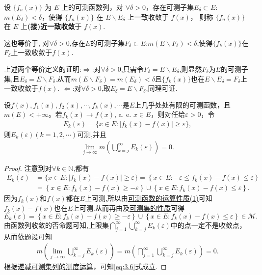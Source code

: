 \documentclass[../../main.tex]{subfiles}
\begin{document}
\begin{definition}[(接)近一致收敛]
设 $\{f_n(x)\}$ 为 $E$ 上的可测函数列，对 $\forall\delta > 0$，存在可测子集$E_\delta\subset E$:$m(E_\delta) < \delta$，使得 $\{f_n(x)\}$ 在 $E\backslash E_\delta$ 上一致收敛于 $f(x)$，
则称 $\{f_n(x)\}$ 在 $E$ 上\textbf{(接)近一致收敛}于 $f(x)$. 

这也等价于,
对$\forall \delta >0$,存在$E$的可测子集$F_\delta\subset E$:$m(E\backslash F_\delta)<\delta$,使得$\{f_k(x)\}$在$F_\delta$上一致收敛于$f(x)$.
\end{definition}
\begin{remark}
上述两个等价定义的证明:$\Rightarrow$:对$\forall \delta >0$,只需令$F_\delta=E\backslash E_\delta$,则显然$F_\delta$为$E$的可测子集,且$E_\delta=E\backslash F_\delta$.从而$m(E\backslash F_\delta)=m(E_\delta)<\delta$且$\{f_k(x)\}$也在$E\backslash E_\delta=F_\delta$上一致收敛于$f(x)$.
$\Leftarrow$:对$\forall \delta >0$,取$E_\delta=E\backslash F_\delta$,同理可证.
\end{remark}

\begin{lemma}\label{lemma:引理3.11}
设$f(x), f_1(x), f_2(x), \cdots, f_k(x), \cdots$是$E$上几乎处处有限的可测函数，且$m(E) < +\infty$。若$f_k(x) \to f(x)$, a. e. $x \in E$，则对任给$\varepsilon > 0$，令
\begin{align*}
E_k(\varepsilon) = \{x \in E: |f_k(x) - f(x)| \geqslant \varepsilon\},
\end{align*}
则$E_k(\varepsilon)(k=1,2,\cdots)$可测,并且
\begin{align}
\lim_{j \to \infty} m\left( \bigcup_{k = j}^{\infty} E_k(\varepsilon) \right) = 0. \label{eq:3.6}
\end{align}
\end{lemma}
\begin{proof}
注意到对$\forall k\in \mathbb{N}$,都有
\begin{align*}
E_k(\varepsilon )&=\{x\in E:|f_k(x)-f(x)|\geqslant \varepsilon \}=\left\{ x\in E:-\varepsilon \leqslant f_k(x)-f(x)\leqslant \varepsilon \right\} 
\\
&=\left\{ x\in E:f_k(x)-f(x)\geqslant -\varepsilon \right\} \cup \left\{ x\in E:f_k(x)-f(x)\leqslant \varepsilon \right\} .
\end{align*}
因为$f_k(x)$和$f(x)$都在$E$上可测,所以由\hyperref[theorem:可测函数的运算性质]{可测函数的运算性质(1)}可知$f_k(x)-f(x)$也在$E$上可测.从而再由及\hyperref[theorem:可测集的性质]{可测集的性质}可得
\[
E_k(\varepsilon)=\left\{ x\in E:f_k(x)-f(x)\geqslant -\varepsilon \right\} \cup \left\{ x\in E:f_k(x)-f(x)\leqslant \varepsilon \right\}\in \mathscr{M}.
\]
由函数列收敛的否命题可知,上限集$\bigcap_{j = 1}^{\infty} \bigcup_{k = j}^{\infty} E_k(\varepsilon)$中的点一定不是收敛点，从而依题设可知
\begin{align*}
m\left( \lim_{j \to \infty}\bigcup_{k = j}^{\infty} E_k(\varepsilon) \right)=m\left( \bigcap_{j = 1}^{\infty} \bigcup_{k = j}^{\infty} E_k(\varepsilon) \right) = 0.
\end{align*}
根据\hyperref[corollary:递减可测集列的测度运算]{递减可测集列的测度运算}，可知\eqref{eq:3.6}式成立.
\end{proof}
\end{document}
